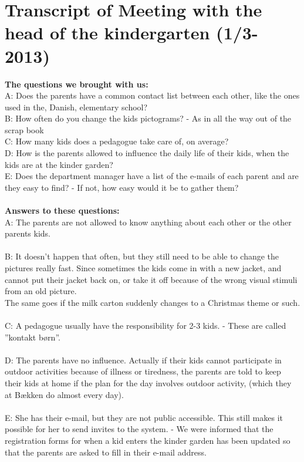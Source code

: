 \chapter{Transcript of Meeting with the head of the kindergarten (1/3-2013)}
\label{interviewMette}

\textbf{The questions we brought with us:}\\
A: Does the parents have a common contact list between each other, like the ones used in the, Danish, elementary school?\\
B: How often do you change the kids pictograms? - As in all the way out of the scrap book\\
C: How many kids does a pedagogue take care of, on average?\\
D: How is the parents allowed to influence the daily life of their kids, when the kids are at the kinder garden?\\
E: Does the department manager have a list of the e-mails of each parent and are they easy to find? - If not, how easy would it be to gather them?\\
\\
\textbf{Answers to these questions:}\\
A: The parents are not allowed to know anything about each other or the other parents kids.\\
\\
B: It doesn’t happen that often, but they still need to be able to change the pictures really fast. Since sometimes the kids come in with a new jacket, and cannot put their jacket back on, or take it off because of the wrong visual stimuli from an old picture.\\
The same goes if the milk carton suddenly changes to a Christmas theme or such.\\
\\
C: A pedagogue usually have the responsibility for 2-3 kids. - These are called ''kontakt børn''.\\
\\
D: The parents have no influence. Actually if their kids cannot participate in outdoor activities because of illness or tiredness, the parents are told to keep their kids at home if the plan for the day involves outdoor activity, (which they at Bækken do almost every day).\\
\\
E: She has their e-mail, but they are not public accessible. This still makes it possible for her to send invites to the system. - We were informed that the registration forms for when a kid enters the kinder garden has been updated so that the parents are asked to fill in their e-mail address.\\

